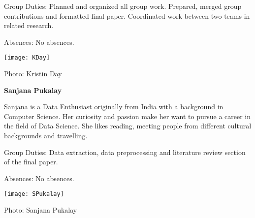 \documentclass[11pt]{article}
\begin{document}
Group Duties:  Planned and organized all group work.  Prepared, merged group contributions and formatted final paper.  Coordinated work between two teams in related research. 

Absences:  No absences.
 
\vspace{5mm}
\texttt{[image: KDay]}

Photo: Kristin Day

\vspace{10mm}
\noindent \textbf{Sanjana Pukalay}

Sanjana is a Data Enthusiast originally from India with a background in Computer Science. Her curiosity and passion make her want to pursue a career in the field of Data Science. She likes reading, meeting people from different cultural backgrounds and travelling.  

Group Duties:  Data extraction, data preprocessing and literature review section of the final paper.

Absences:  No absences.

\vspace{5mm}
\texttt{[image: SPukalay]}

Photo: Sanjana Pukalay
\end{document}
